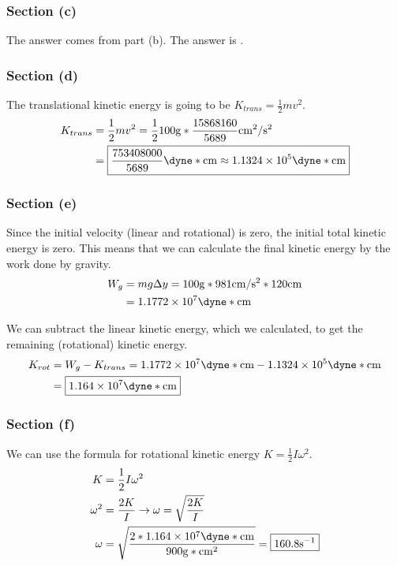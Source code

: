 \documentclass[12pt]{article}
\begin{document}
\subsubsection{Section (c)}
The answer comes from part (b). The answer is .

\subsubsection{Section (d)}
The translational kinetic energy is going to be \(K_{trans} = \frac{1}{2}mv^2\).
\begin{align}
    K_{trans}   &=  \frac{1}{2}mv^2
        =   \frac{1}{2}100\unit{\gram}*\frac{15868160}{5689}\unit{\centi\meter^2/\second^2}\\
        &=  \boxed{\frac{753408000}{5689}\unit{\dyne*\centi\meter} \approx 1.1324\times10^5\unit{\dyne*\centi\meter}}
\end{align}

\subsubsection{Section (e)}
Since the initial velocity (linear and rotational) is zero, the initial total kinetic energy is zero. This means that we can calculate the final kinetic energy by the work done by gravity.
\begin{align}
    W_g &=  mg\Delta y
        =   100\unit{\gram}*981\unit{\centi\meter/\second^2}*120\unit{\centi\meter}\\
        &=  1.1772\times10^7\unit{\dyne*\centi\meter}
\end{align}

We can subtract the linear kinetic energy, which we calculated, to get the remaining (rotational) kinetic energy.
\begin{align}
    K_{rot} &=  W_g - K_{trans}
        =   1.1772\times10^7\unit{\dyne*\centi\meter} - 1.1324\times10^5\unit{\dyne*\centi\meter}\\
        &=  \boxed{1.164\times10^7\unit{\dyne*\centi\meter}}
\end{align} 

\subsubsection{Section (f)}
We can use the formula for rotational kinetic energy \(K = \frac{1}{2}I\omega^2\).
\begin{align}
    K   &=  \frac{1}{2}I\omega^2\\
    \omega^2    &=  \frac{2K}{I} \rightarrow \omega = \sqrt{\frac{2K}{I}}\\
    \omega  &=  \sqrt{\frac{2*1.164\times10^7\unit{\dyne*\centi\meter}}{900\unit{\gram*\centi\meter^2}}}
        =   \boxed{160.8\unit{\second^{-1}}}
\end{align}
\end{document}
